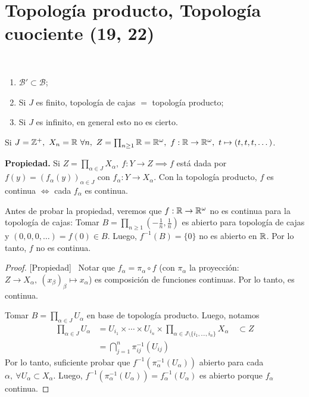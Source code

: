 \section{Topología producto, Topología cuociente (19, 22)}

\begin{remark}~
	\begin{enumerate}
		\item $\mathcal{B}' \subset \mathcal{B}$;

		\item Si $J$ es finito, topología de cajas $=$ topología producto;

		\item Si $J$ es infinito, en general esto no es cierto.
	\end{enumerate}
\end{remark}

\begin{eg}
	Si $J = \mathbb{Z}^+,\ X_n = \mathbb{R} \ \forall n,\ Z = \prod_{n\geq 1} \mathbb{R} = \mathbb{R}^{\omega},\ f: \mathbb{R} \to \mathbb{R}^{\omega},\ t \mapsto (t,t,t,\dots)$.
\end{eg}

\noindent \textbf{Propiedad.} Si $Z = \prod_{\alpha \in J} X_{\alpha},\ f: Y \to Z \implies f$ está dada por $f(y) = (f_{\alpha}(y))_{\alpha \in J}$ con $f_{\alpha}: Y \to X_{\alpha}$. Con la topología producto, $f$ es continua $\iff$ cada $f_{\alpha}$ es continua. \newline

\noindent Antes de probar la propiedad, veremos que $f:\mathbb{R} \to \mathbb{R}^{\omega}$ no es continua para la topología de cajas: Tomar $B = \prod_{n\geq 1} \left( -\frac{1}{n}, \frac{1}{n}\right)$ es abierto para topología de cajas y $(0,0,0,\dots) = f(0) \in B$. Luego, $f^{-1}(B) = \{0\}$ no es abierto en $\mathbb{R}$. Por lo tanto, $f$ no es continua. \newline

\begin{proof}[Proof][Propiedad]~
	\Onlyifstep Notar que $f_{\alpha} = \pi_{\alpha} \circ f$ (con $\pi_{\alpha}$ la proyección: $Z\to X_{\alpha},\ (x_{\beta})_{\beta} \mapsto x_{\alpha}$) es composición de funciones continuas. Por lo tanto, es continua.\newline

	\noindent \Ifstep Tomar $B = \prod_{\alpha \in J} U_{\alpha}$ en base de topología producto. Luego, notamos
	\begin{align*}
		\prod_{\alpha \in J} U_{\alpha} & = U_{i_1} \times \cdots \times U_{i_n} \times \prod_{\alpha \in J \setminus \{i_1,\dots,i_n\}  } X_{\alpha} \quad \subset Z \\
		& = \bigcap_{j=1}^{n} \pi_{ij}^{-1} (U_{ij})
	\end{align*}
	Por lo tanto, suficiente probar que $f^{-1}(\pi_{\alpha}^{-1}(U_{\alpha}))$ abierto para cada $\alpha,\ \forall U_{\alpha} \subset X_{\alpha}$. Luego, $f^{-1}(\pi_{\alpha}^{-1}(U_{\alpha})) = f_{\alpha}^{-1}(U_{\alpha})$ es abierto porque $f_{\alpha}$ continua.
\end{proof}

